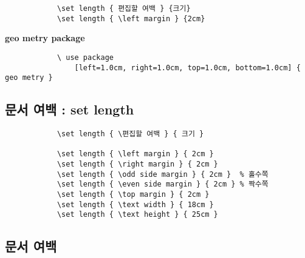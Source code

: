 \documentclass[12pt,a4paper]{book}
\begin{document}
	
		\setlength{\fboxsep}{12pt}
		\begin{boxedminipage}[c]{1.0\linewidth}
			\begin{verbatim}
			\set length { 편집할 여백 } {크기}
			\set length { \left margin } {2cm}
			\end{verbatim} 
		\end{boxedminipage}
		
		
		\textbf{ geo metry package }\\
		\setlength{\fboxsep}{12pt}
		\begin{boxedminipage}[c]{1.0\linewidth}
			\begin{verbatim}
			\ use package 
				[left=1.0cm, right=1.0cm, top=1.0cm, bottom=1.0cm] { geo metry }
			\end{verbatim}
		\end{boxedminipage}



	\newpage  
	\subsection*{문서 여백 : set length }

		\singlespacing
		\setlength{\fboxsep}{12pt}
		\begin{boxedminipage}[c]{1.0\linewidth}
			\begin{verbatim}
			\set length { \편집할 여백 } { 크기 }
			
			\set length { \left margin } { 2cm }
			\set length { \right margin } { 2cm }
			\set length { \odd side margin } { 2cm }  % 홀수쪽
			\set length { \even side margin } { 2cm } % 짝수쪽
			\set length { \top margin } { 2cm }
			\set length { \text width } { 18cm }
			\set length { \text height } { 25cm }
			\end{verbatim} 
		\end{boxedminipage}
		\doublespacing

	\newpage  
	\subsection*{문서 여백}
\end{document}
